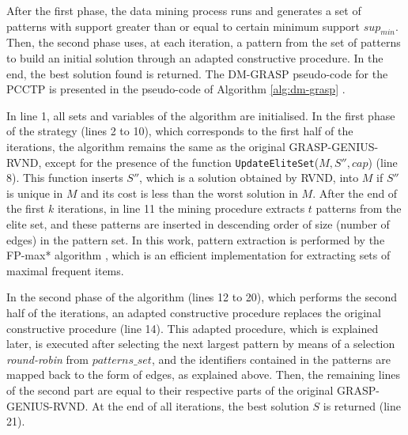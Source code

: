 \documentclass{singlecol-new}
\begin{document}
After the first phase, the data mining process runs and generates a set of patterns with support greater than or equal to certain minimum support $sup_{min}$. Then, the second phase uses, at each iteration, a pattern from the set of patterns to build an initial solution through an adapted constructive procedure. In the end, the best solution found is returned. The DM-GRASP pseudo-code for the PCCTP is presented in the pseudo-code of Algorithm \ref{alg:dm-grasp} .

In line 1, all sets and variables of the algorithm are initialised. In the first phase of the strategy (lines 2 to 10), which corresponds to the first half of the iterations, the algorithm remains the same as the original GRASP-GENIUS-RVND, except for the presence of the function \texttt{UpdateEliteSet}($M, S'', cap$) (line 8). This function inserts $S''$, which is a solution obtained by RVND, into $M$ if $S''$ is unique in $M$ and its cost is less than the worst solution in $M$. After the end of the first $k$ iterations, in line 11 the mining procedure extracts $t$ patterns from the elite set, and these patterns are inserted in descending order of size (number of edges) in the pattern set. In this work, pattern extraction is performed by the FP-max* algorithm \cite{goethals04}, which is an efficient implementation for extracting sets of maximal frequent items.

In the second phase of the algorithm (lines 12 to 20), which performs the second half of the iterations, an adapted constructive procedure replaces the original constructive procedure (line 14). This adapted procedure, which is explained
later, is executed after selecting the next largest pattern by means of a selection \textit{round-robin} \cite{furnkranz2001round} from $patterns\_set$, and the identifiers contained in the patterns are mapped back to the form of edges, as explained above. Then, the remaining lines of the second part are equal to their respective parts of the original GRASP-GENIUS-RVND. At the end of all iterations, the best solution $S$ is returned (line 21).
\end{document}
